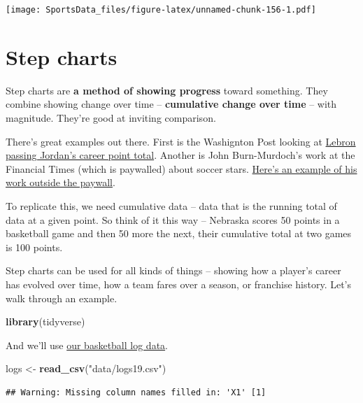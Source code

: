 \documentclass[
]{book}
\newenvironment{Shaded}{\begin{snugshade}}{\end{snugshade}}
\newcommand{\KeywordTok}[1]{\textcolor[rgb]{0.13,0.29,0.53}{\textbf{#1}}}
\newcommand{\NormalTok}[1]{#1}
\newcommand{\StringTok}[1]{\textcolor[rgb]{0.31,0.60,0.02}{#1}}
\begin{document}
\texttt{[image: SportsData\_files/figure-latex/unnamed-chunk-156-1.pdf]}

\hypertarget{step-charts}{%
\chapter{Step charts}\label{step-charts}}

Step charts are \textbf{a method of showing progress} toward something. They combine showing change over time -- \textbf{cumulative change over time} -- with magnitude. They're good at inviting comparison.

There's great examples out there. First is the Washignton Post looking at \href{https://www.washingtonpost.com/graphics/sports/lebron-james-michael-jordan-nba-scoring-list/?utm_term=.481074150849}{Lebron passing Jordan's career point total}. Another is John Burn-Murdoch's work at the Financial Times (which is paywalled) about soccer stars. \href{http://johnburnmurdoch.github.io/projects/goal-lines/CL/}{Here's an example of his work outside the paywall}.

To replicate this, we need cumulative data -- data that is the running total of data at a given point. So think of it this way -- Nebraska scores 50 points in a basketball game and then 50 more the next, their cumulative total at two games is 100 points.

Step charts can be used for all kinds of things -- showing how a player's career has evolved over time, how a team fares over a season, or franchise history. Let's walk through an example.

\begin{Shaded}
\begin{Highlighting}[]
\KeywordTok{library}\NormalTok{(tidyverse)}
\end{Highlighting}
\end{Shaded}

And we'll use \href{https://unl.box.com/s/a8m91bro10t89watsyo13yjegb1fy009}{our basketball log data}.

\begin{Shaded}
\begin{Highlighting}[]
\NormalTok{logs <-}\StringTok{ }\KeywordTok{read_csv}\NormalTok{(}\StringTok{"data/logs19.csv"}\NormalTok{)}
\end{Highlighting}
\end{Shaded}

\begin{verbatim}
## Warning: Missing column names filled in: 'X1' [1]
\end{verbatim}
\end{document}
